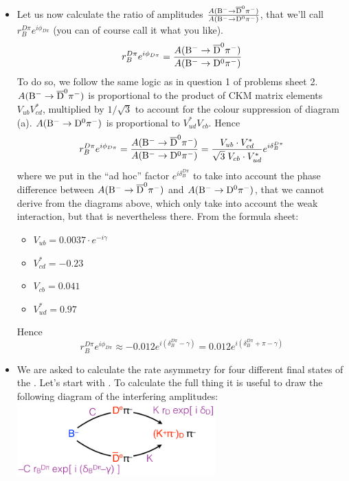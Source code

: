\begin{enumerate}[a)]
{\begin{itemize}
    \item Let us now calculate the ratio of amplitudes $
      \frac{A({\rm B^- \to {\rm \overline{D}^0} \pi^-})}{A({\rm B^- \to {\rm D^{0}} \pi^-})}$,
      that we'll call $r_B^{D\pi} e^{i\phi_{D\pi}}$ (you can of course call it
      what you like).
      \[
      r_B^{D\pi} e^{i\phi_{D\pi}} = \frac{A({\rm B^- \to {\rm \overline{D}^0} \pi^-})}{A({\rm B^- \to {\rm D^{0}} \pi^-})}
      \]
      To do so, we follow the same logic as in question 1 of problems sheet
      2. $A({\rm B^- \to {\rm \overline{D}^0} \pi^-})$ is proportional to the product of
      CKM matrix elements $V_{ub} V_{cd}^*$, multiplied by $1/\sqrt{3}$ to
      account for the colour suppression of diagram (a). $A({\rm B^- \to
        {\rm D^{0}} \pi^-})$ is proportional to $V_{ud}^* V_{cb}$. Hence
      \[
      r_B^{D\pi} e^{i\phi_{D\pi}} = 
      \frac{A({\rm B^- \to {\rm \overline{D}^0} \pi^-})}{A({\rm B^- \to {\rm D^{0}} \pi^-})} = 
      \frac{V_{ub} \cdot V^*_{cd}}{\sqrt{3} \; V_{cb} \cdot V_{ud}^*} e^{i\delta_B^{D\pi}}
      \]
      where we put in the ``ad hoc'' factor $e^{i\delta_B^{D\pi}}$ to take into
      account the phase difference between $A({\rm B^- \to {\rm \overline{D}^0} \pi^-})$
      and $A({\rm B^- \to {\rm D^{0}} \pi^-})$, that we cannot derive
      from the diagrams above, which only take into account the weak
      interaction, but that is nevertheless there.
      From the formula sheet: 
      \begin{itemize}
      \item $V_{ub}   = 0.0037 \cdot e^{-i\gamma}$
      \item $V_{cd}^* = -0.23$
      \item $V_{cb}   = 0.041$
      \item $V_{ud}^* = 0.97$
      \end{itemize}
      Hence
      \[
      r_B^{D\pi} e^{i\phi_{D\pi}} \approx -0.012 e^{i(\delta_B^{D\pi} -
        \gamma)}
      = 0.012 e^{i(\delta_B^{D\pi} + \pi - \gamma)}
      \]
    \item We are asked to calculate the rate asymmetry for four
      different final states of the \Do. Let's start with .  To calculate the full thing it is useful to
      draw the following diagram of the interfering amplitudes:
      \\\includegraphics[width=0.6\textwidth]{problemsheets/ps4figs/B2Dpi_Interference}\\

\end{itemize}}
\end{enumerate}
